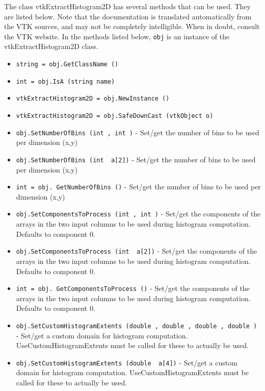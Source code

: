 The class vtkExtractHistogram2D has several methods that can be used.
  They are listed below.
Note that the documentation is translated automatically from the VTK sources,
and may not be completely intelligible.  When in doubt, consult the VTK website.
In the methods listed below, \verb|obj| is an instance of the vtkExtractHistogram2D class.
\begin{itemize}
\item  \verb|string = obj.GetClassName ()|

\item  \verb|int = obj.IsA (string name)|

\item  \verb|vtkExtractHistogram2D = obj.NewInstance ()|

\item  \verb|vtkExtractHistogram2D = obj.SafeDownCast (vtkObject o)|

\item  \verb|obj.SetNumberOfBins (int , int )| -  Set/get the number of bins to be used per dimension (x,y)

\item  \verb|obj.SetNumberOfBins (int  a[2])| -  Set/get the number of bins to be used per dimension (x,y)

\item  \verb|int = obj. GetNumberOfBins ()| -  Set/get the number of bins to be used per dimension (x,y)

\item  \verb|obj.SetComponentsToProcess (int , int )| -  Set/get the components of the arrays in the two input columns
 to be used during histogram computation.  Defaults to component 0.

\item  \verb|obj.SetComponentsToProcess (int  a[2])| -  Set/get the components of the arrays in the two input columns
 to be used during histogram computation.  Defaults to component 0.

\item  \verb|int = obj. GetComponentsToProcess ()| -  Set/get the components of the arrays in the two input columns
 to be used during histogram computation.  Defaults to component 0.

\item  \verb|obj.SetCustomHistogramExtents (double , double , double , double )| -  Set/get a custom domain for histogram computation.  UseCustomHistogramExtents
 must be called for these to actually be used.

\item  \verb|obj.SetCustomHistogramExtents (double  a[4])| -  Set/get a custom domain for histogram computation.  UseCustomHistogramExtents
 must be called for these to actually be used.


\end{itemize}
